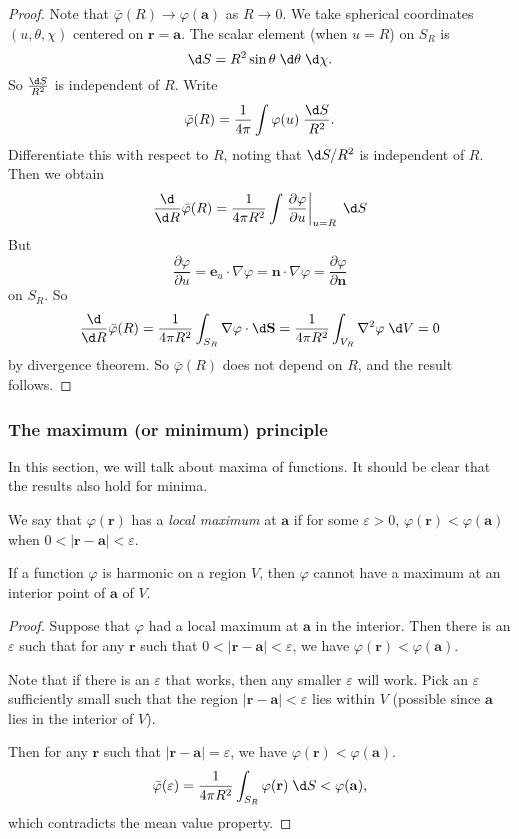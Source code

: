 \documentclass[a4paper]{article}
\begin{document}
\begin{proof}
  Note that $\bar\varphi (R) \to \varphi(\mathbf{a})$ as $R \to 0$. We take spherical coordinates $(u, \theta, \chi)$ centered on $\mathbf{r} = \mathbf{a}$. The scalar element (when $u = R$) on $S_R$ is
  \[
    \d S = R^2 \sin \theta\;\d \theta\;\d \chi.
  \]
  So $\frac{\d S}{R^2}$ is independent of $R$. Write
  \[
    \bar\varphi(R) = \frac{1}{4\pi}\int \varphi(u)\;\frac{\d S}{R^2}.
  \]
  Differentiate this with respect to $R$, noting that $\d S/R^2$ is independent of $R$. Then we obtain
  \[
    \frac{\d}{\d R}\bar\varphi(R) = \frac{1}{4\pi R^2}\int \left.\frac{\partial \varphi}{\partial u}\right|_{u = R}\;\d S
  \]
  But
  \[
    \frac{\partial\varphi}{\partial u} = \mathbf{e}_u \cdot \nabla \varphi = \mathbf{n}\cdot \nabla \varphi = \frac{\partial\varphi}{\partial \mathbf{n}}
  \]
  on $S_R$. So
  \[
    \frac{\d}{\d R}\bar\varphi(R) = \frac{1}{4\pi R^2}\int_{S_R} \nabla \varphi \cdot \d \mathbf{S} = \frac{1}{4\pi R^2}\int_{V_R}\nabla^2 \varphi \;\d V = 0
  \]
  by divergence theorem. So $\bar \varphi(R)$ does not depend on $R$, and the result follows.
\end{proof}
\subsubsection{The maximum (or minimum) principle}
In this section, we will talk about maxima of functions. It should be clear that the results also hold for minima.

\begin{defi}
  We say that $\varphi(\mathbf{r})$ has a \emph{local maximum} at $\mathbf{a}$ if for some $\varepsilon > 0$, $\varphi(\mathbf{r}) < \varphi(\mathbf{a})$ when $0 < |\mathbf{r} - \mathbf{a}| < \varepsilon$.
\end{defi}

\begin{prop}
  If a function $\varphi$ is harmonic on a region $V$, then $\varphi$ cannot have a maximum at an interior point of $\mathbf{a}$ of $V$.
\end{prop}

\begin{proof}
  Suppose that $\varphi$ had a local maximum at $\mathbf{a}$ in the interior. Then there is an $\varepsilon$ such that for any $\mathbf{r}$ such that $0 < |\mathbf{r} - \mathbf{a}| < \varepsilon$, we have $\varphi(\mathbf{r}) < \varphi (\mathbf{a})$.

  Note that if there is an $\varepsilon$ that works, then any smaller $\varepsilon$ will work. Pick an $\varepsilon$ sufficiently small such that the region $|\mathbf{r} - \mathbf{a}| < \varepsilon$ lies within $V$ (possible since $\mathbf{a}$ lies in the interior of $V$).

  Then for any $\mathbf{r}$ such that $|\mathbf{r} - \mathbf{a}| = \varepsilon$, we have $\varphi(\mathbf{r}) < \varphi(\mathbf{a})$.
  \[
    \bar\varphi (\varepsilon) = \frac{1}{4\pi R^2}\int_{S_R}\varphi(\mathbf{r})\;\d S < \varphi(\mathbf{a}),
  \]
  which contradicts the mean value property.
\end{proof}
\end{document}
